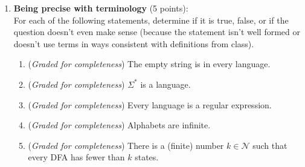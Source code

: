 \documentclass[12pt, oneside]{article}
\newcommand{\gradeCorrect}{({\it Graded for correctness}) }
\newcommand{\gradeComplete}{({\it Graded for completeness}) }
\begin{document}
\begin{enumerate}[wide, labelwidth=!, labelindent=0pt]
    \begin{enumerate}
    \item \gradeComplete Find and fix the mistake in the 
    following symbolic description of the transition function $\delta \colon Q \times \Sigma \to Q$: for each $j \in \{0,1\}$
    \[
    \delta(q_0, j) = q_j \hspace{2cm} \delta(q_1, j) = q_{1-j} \hspace{2cm} \delta(q_2, j) = q_{1+j}
    \]
    \item \gradeCorrect Keeping the same set of states $Q = \{q_0, q_1, q_2\}$, alphabet $\Sigma = \{0,1\}$, starting state $q_0$, and set
    of accepting states $F = \{q_0\}$, change the transition function $\delta$ so that the resulting finite
    automaton recognizes the language 
    described by the regular expression
    \[
        0^* \cup \Sigma^* 1000^*
    \]
    Briefly justify why the resulting finite automaton works 
    by describing the role of each state with your new transition function and relating it to a plain English description 
    of the language described by the regular expression.

    Note: with regular expressions $*$ binds more tightly than concatenation 
    so $1000^* = (100)(0^*)$.

    \end{enumerate}
    {\it (Challenge question, not graded) There is a beautiful plain English description of the language recognized by the finite automaton
    with the state diagram depicted at the start of Problem~3. 
    What is it?}

\item \textbf{Being precise with terminology} (5 points): \\
    For each of the following statements, determine if 
    it is true, false, or if the question doesn't even 
    make sense (because the statement isn't well formed
    or doesn't use terms in ways consistent with definitions from class).

    \begin{enumerate}
    \item\gradeComplete The empty string is in every language.
    \item\gradeComplete $\Sigma^*$ is a language.
    \item\gradeComplete Every language is a regular expression.
    \item\gradeComplete Alphabets are infinite.
    \item\gradeComplete There is a (finite) number $k \in \mathcal N$ such that every DFA has fewer than $k$ states.
    \end{enumerate}
\end{enumerate}
\end{document}
